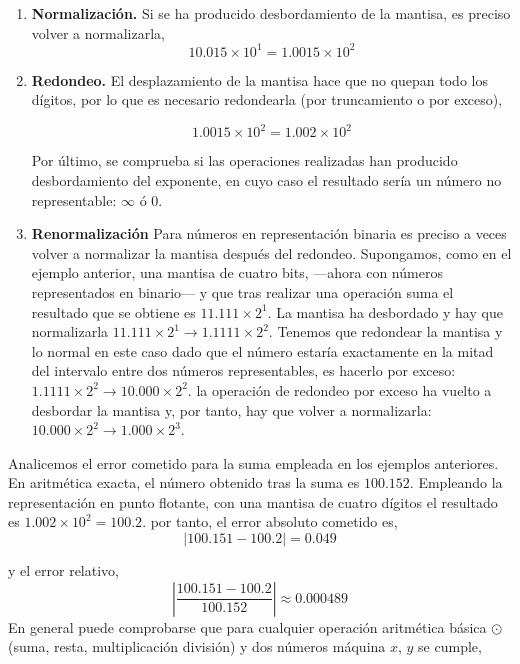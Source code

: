 \begin{enumerate}
\item \textbf{Normalización.}
Si se ha producido desbordamiento de la mantisa, es preciso volver a normalizarla,
\begin{equation*}
10.015\times10^1=1.0015\times10^2
\end{equation*}
 
\item \textbf{Redondeo.} El desplazamiento de la mantisa hace que no quepan todo los dígitos, por lo que es necesario redondearla (por truncamiento o por exceso),

\begin{equation*}
1.0015\times10^2=1.002\times10^2
\end{equation*}

Por último, se comprueba si las operaciones realizadas han producido desbordamiento del exponente, en cuyo caso el resultado sería un número no representable: $\infty$ ó $0$.

\item \textbf{Renormalización} Para números en representación binaria es preciso a veces volver a normalizar la mantisa después del redondeo. Supongamos, como en el ejemplo anterior, una mantisa de cuatro bits, ---ahora con números representados en binario--- y que tras realizar una operación suma el resultado que se obtiene es $11.111\times2^1$. La mantisa ha desbordado y hay que normalizarla $11.111\times2^1\rightarrow1.1111\times2^2$. Tenemos que redondear la mantisa y lo normal en este caso dado que el número estaría exactamente en la mitad del intervalo entre dos números representables, es hacerlo por exceso: $1.1111\times2^2\rightarrow10.000\times2^2$. la operación de redondeo por exceso ha vuelto a desbordar la mantisa y, por tanto, hay que volver a normalizarla: $10.000\times2^2\rightarrow1.000\times2^3$.
\end{enumerate} 

Analicemos el error cometido para la suma empleada en los ejemplos anteriores. En aritmética exacta, el número obtenido tras la suma es $100.152$. Empleando la representación en punto flotante, con una mantisa de cuatro dígitos el resultado es $1.002\times10^2=100.2$. por tanto, el error absoluto cometido es,
\begin{equation*}
\vert 100.151-100.2 \vert=0.049
\end{equation*}

y el error relativo,
\begin{equation*}
\left\vert\frac{100.151-100.2 }{100.152}\right\vert\approx 0.000489
\end{equation*}
En general puede comprobarse que para cualquier operación aritmética básica $\odot \ $(suma, resta, multiplicación división) y dos números máquina $x$, $y$ se cumple,

